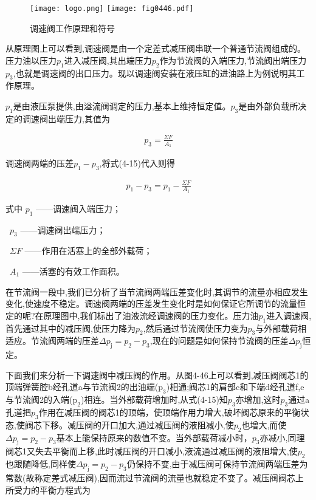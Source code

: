 \begin{figure}
\centering
\ifOpenSource
\texttt{[image: logo.png]}
\else
\texttt{[image: fig0446.pdf]}
\fi
\caption{调速阀工作原理和符号}
\label{fig:fig0446}
\end{figure}

从原理图上可以看到,调速阀是由一个定差式减压阀串联一个普通节流阀组成的。压力油以压力$p_1$进入减压阀,其出端压力$p_2$作为节流阀的入端压力,节流阀出端压力$p_3$,也就是调速阀的出口压力。现以调速阀安装在液压缸的进油路上为例说明其工作原理。

$p_1$是由液压泵提供,由溢流阀调定的压力,基本上维持恒定值。$p_3$是由外部负载所决定的调速阀出端压力,其值为

\begin{equation}
\begin{split}
p_3 = \frac{\Sigma F}{A_1}
\end{split}
\end{equation}

调速阀两端的压差$p_1 - p_3$,将式(4-15)代入则得

\begin{equation}
\begin{split}
p_1 - p_3= p_1-\frac{\Sigma F}{A_1}
\end{split}
\end{equation}

\noindent
式中 $p_1$ ——调速阀入端压力；

\ $p_3$ ——调速阀出端压力；

\ $\Sigma F$ ——作用在活塞上的全部外载荷；

\ $A_1$ ——活塞的有效工作面积。

在节流阀一段中,我们已分析了当节流阀两端压差变化时,其调节的流量亦相应发生变化,使速度不稳定。调速阀两端的压差发生变化时是如何保证它所调节的流量恒定的呢?在原理图中,我们标出了油液流经调速阀的压力变化。压力油$p_1$进入调速阀,首先通过其中的减压阀,使压力降为$p_2$,然后通过节流阀使压力变为$p_3$与外部载荷相适应。节流阀两端的压差$\Delta p_\text{j}=p_2-p_3$,现在的问题是如何保持节流阀的压差$\Delta p_\text{j}$恒定。

下面我们来分析一下调速阀中减压阀的作用。从图4-46上可以看到,减压阀阀芯1的顶端弹簧腔b经孔道a与节流阀2的出油端($\text{p}_3$)相通;阀芯1的肩部c和下端d经孔道f,e与节流阀2的入端($\text{p}_2$)相连。当外部载荷增加时,从式(4-15)知$p_3$亦增加,这时$p_3$通过a孔道把$p_3$作用在减压阀的阀芯1的顶端，使顶端作用力增大,破坏阀芯原来的平衡状态,使阀芯下移。减压阀的开口加大,通过减压阀的液阻减小,使$p_2$也增大,而使$\Delta p_\text{j} = p_2-p_3$基本上能保持原来的数值不变。当外部载荷减小时，$p_3$亦减小,同理阀芯1又失去平衡而上移,此时减压阀的开口减小,液流通过减压阀的液阻增大,使$p_2$也跟随降低,同样使$\Delta p_\text{j} = p_2-p_3$仍保持不变,由于减压阀可保持节流阀两端压差为常数(故称定差式减压阀),因而流过节流阀的流量也就稳定不变了。减压阀阀芯上所受力的平衡方程式为


